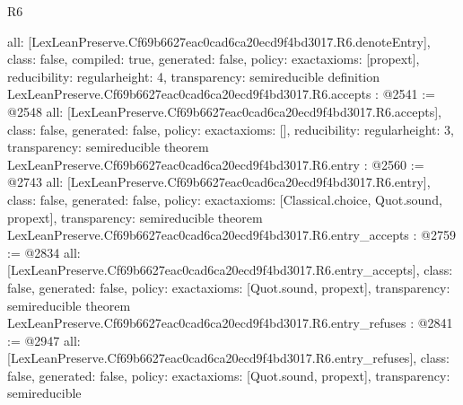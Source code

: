 \begin{lexlean}{R6}
\begin{coremodule}
{  all: [LexLeanPreserve.Cf69b6627eac0cad6ca20ecd9f4bd3017.R6.denoteEntry],
  class: false,
  compiled: true,
  generated: false,
  policy: exact{axioms: [propext]},
  reducibility: regular{height: 4},
  transparency: semireducible
}
definition LexLeanPreserve.Cf69b6627eac0cad6ca20ecd9f4bd3017.R6.accepts : @2541 := @2548 {
  all: [LexLeanPreserve.Cf69b6627eac0cad6ca20ecd9f4bd3017.R6.accepts],
  class: false,
  generated: false,
  policy: exact{axioms: []},
  reducibility: regular{height: 3},
  transparency: semireducible
}
theorem LexLeanPreserve.Cf69b6627eac0cad6ca20ecd9f4bd3017.R6.entry : @2560 := @2743 {
  all: [LexLeanPreserve.Cf69b6627eac0cad6ca20ecd9f4bd3017.R6.entry],
  class: false,
  generated: false,
  policy: exact{axioms: [Classical.choice, Quot.sound, propext]},
  transparency: semireducible
}
theorem LexLeanPreserve.Cf69b6627eac0cad6ca20ecd9f4bd3017.R6.entry_accepts : @2759 := @2834 {
  all: [LexLeanPreserve.Cf69b6627eac0cad6ca20ecd9f4bd3017.R6.entry_accepts],
  class: false,
  generated: false,
  policy: exact{axioms: [Quot.sound, propext]},
  transparency: semireducible
}
theorem LexLeanPreserve.Cf69b6627eac0cad6ca20ecd9f4bd3017.R6.entry_refuses : @2841 := @2947 {
  all: [LexLeanPreserve.Cf69b6627eac0cad6ca20ecd9f4bd3017.R6.entry_refuses],
  class: false,
  generated: false,
  policy: exact{axioms: [Quot.sound, propext]},
  transparency: semireducible
}


\end{coremodule}
\end{lexlean}
